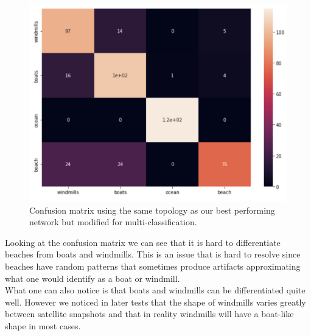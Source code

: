 \begin{figure}[ht]
\begin{center}
\centerline{\includegraphics[width=\columnwidth]{images/mul-confusion.png}}
\caption{Confusion matrix using the same topology as our best performing network but modified for multi-classification.}
\label{mul-confusion}
\end{center}
\end{figure}

Looking at the confusion matrix we can see that it is hard to differentiate beaches from boats and windmills. This is an issue that is hard to resolve since beaches have random patterns that sometimes produce artifacts approximating what one would identify as a boat or windmill.\\

What one can also notice is that boats and windmills can be differentiated quite well. However we noticed in later tests that the shape of windmills varies greatly between satellite snapshots and that in reality windmills will have a boat-like shape in most cases.

